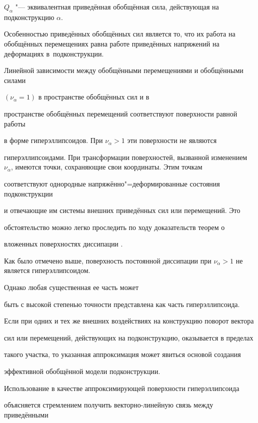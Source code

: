 $Q_\alpha$ "--- эквивалентная приведённая обобщённая сила, действующая на подконструкцию $\alpha$.



Особенностью приведённых обобщённых сил является то, что их работа на обобщённых перемещениях равна работе приведённых напряжений на деформациях в~подконструкции.



Линейной зависимости между обобщёнными перемещениями и обобщёнными силами

$(\nu_\alpha =1)$ в пространстве обобщённых сил и в

пространстве обобщённых перемещений соответствуют поверхности равной работы

в форме гиперэллипсоидов. При $\nu_\alpha >1$ эти поверхности не являются

гиперэллипсоидами. При трансформации поверхностей, вызванной изменением $\nu

_\alpha $, имеются точки, сохраняющие свои координаты. Этим точкам

соответствуют однородные напряжённо"=деформированные состояния подконструкции

и отвечающие им системы внешних приведённых сил или перемещений. Это

обстоятельство можно легко проследить по ходу доказательств теорем о

вложенных поверхностях диссипации \cite{kleb11:bib14}.



Как было отмечено выше, поверхность постоянной диссипации при $\nu _\alpha >1$ не является гиперэллипсоидом. 

Однако любая существенная ее часть может

быть с высокой степенью точности представлена как часть гиперэллипсоида.

Если при одних и тех же внешних воздействиях на конструкцию поворот вектора

сил или перемещений, действующих на подконструкцию, оказывается в пределах

такого участка, то указанная аппроксимация может явиться основой создания

эффективной обобщённой модели подконструкции.



Использование в качестве аппроксимирующей поверхности гиперэллипсоида

объясняется стремлением получить векторно-линейную связь между приведёнными

